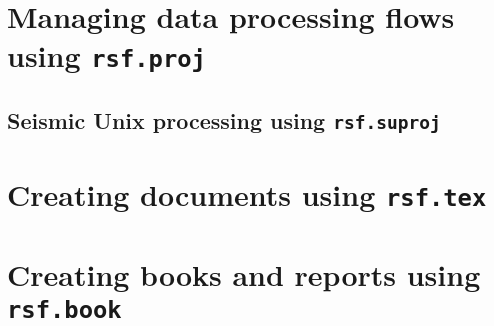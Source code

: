 \section{Managing data processing flows using \texttt{rsf.proj}}

\subsection{Seismic Unix processing using  \texttt{rsf.suproj}}

\section{Creating documents using \texttt{rsf.tex}}

\section{Creating books and reports using \texttt{rsf.book}}



